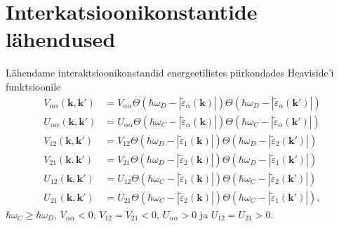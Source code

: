 \documentclass[class=article, crop=false]{standalone}
\begin{document}
\section{Interkatsioonikonstantide lähendused}
Lähendame interaktsioonikonstandid energeetilistes piirkondades Heaviside'i funktsioonile
\begin{equation}\label{key}
	\begin{split}
		V_{ \alpha \alpha} ( \mathbf{k}, \mathbf{k}') & = V_{ \alpha \alpha} \Theta \left( \hbar \omega_{D} - \left| \tilde{ \varepsilon}_{ \alpha} \left( \mathbf{k} \right) \right| \right) \Theta \left( \hbar \omega_{D} - \left| \tilde{ \varepsilon}_{ \alpha} \left( \mathbf{k}' \right)  \right| \right) \\
		U_{ \alpha \alpha} ( \mathbf{k}, \mathbf{k}') & = U_{ \alpha \alpha} \Theta \left( \hbar \omega_{C} - \left| \tilde{ \varepsilon}_{ \alpha} \left( \mathbf{k} \right) \right| \right) \Theta \left( \hbar \omega_{C} - \left| \tilde{ \varepsilon}_{ \alpha} \left( \mathbf{k}' \right)  \right| \right) \\
		V_{ 1 2} ( \mathbf{k}, \mathbf{k}') & = V_{ 1 2} \Theta \left( \hbar \omega_{D} - \left| \tilde{ \varepsilon}_{ 1} \left( \mathbf{k} \right) \right| \right) \Theta \left( \hbar \omega_{D} - \left| \tilde{ \varepsilon}_{ 2} \left( \mathbf{k}' \right)  \right| \right) \\
		V_{ 2 1} ( \mathbf{k}, \mathbf{k}') & = V_{ 2 1} \Theta \left( \hbar \omega_{D} - \left| \tilde{ \varepsilon}_{ 2} \left( \mathbf{k} \right) \right| \right) \Theta \left( \hbar \omega_{D} - \left| \tilde{ \varepsilon}_{ 1} \left( \mathbf{k}' \right)  \right| \right) \\
		U_{ 1 2} ( \mathbf{k}, \mathbf{k}') & = U_{ 1 2} \Theta \left( \hbar \omega_{C} - \left| \tilde{ \varepsilon}_{ 1} \left( \mathbf{k} \right) \right| \right) \Theta \left( \hbar \omega_{C} - \left| \tilde{ \varepsilon}_{ 2} \left( \mathbf{k}' \right)  \right| \right) \\
		U_{ 2 1} ( \mathbf{k}, \mathbf{k}') & = U_{ 2 1} \Theta \left( \hbar \omega_{C} - \left| \tilde{ \varepsilon}_{ 2} \left( \mathbf{k} \right) \right| \right) \Theta \left( \hbar \omega_{C} - \left| \tilde{ \varepsilon}_{ 1} \left( \mathbf{k}' \right)  \right| \right) ,
	\end{split}
\end{equation}
$ \hbar \omega_{C} \geqslant \hbar \omega_{D} $, $ V_{ \alpha \alpha} < 0 $, $ V_{12} = V_{21} < 0 $, $ U_{ \alpha \alpha} > 0 $ ja $U_{12} = U_{21} > 0 $.
\end{document}
